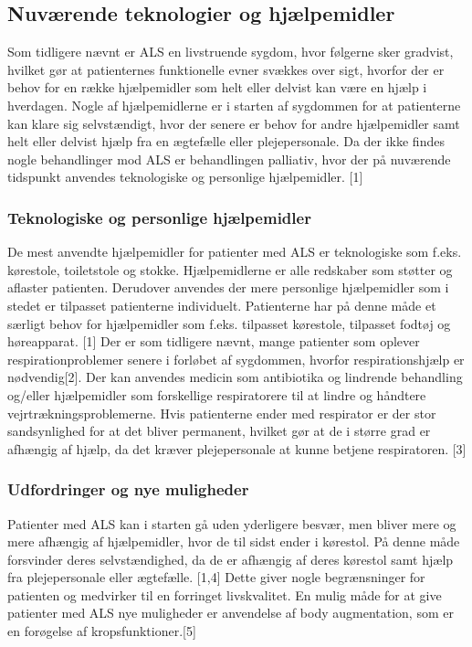 \subsection{Nuværende teknologier og hjælpemidler}
Som tidligere nævnt er ALS en livstruende sygdom, hvor følgerne sker gradvist, hvilket gør at patienternes funktionelle evner svækkes over sigt, hvorfor der er behov for en række hjælpemidler som helt eller delvist kan være en hjælp i hverdagen. Nogle af hjælpemidlerne er i starten af sygdommen for at patienterne kan klare sig selvstændigt, hvor der senere er behov for andre hjælpemidler samt helt eller delvist hjælp fra en ægtefælle eller plejepersonale. Da der ikke findes nogle behandlinger mod ALS er behandlingen palliativ, hvor der på nuværende tidspunkt anvendes teknologiske og personlige hjælpemidler. [1]

\subsubsection{Teknologiske og personlige hjælpemidler}
De mest anvendte hjælpemidler for patienter med ALS er teknologiske som f.eks.  kørestole, toiletstole og stokke. Hjælpemidlerne er alle redskaber som støtter og aflaster patienten. Derudover anvendes der mere personlige hjælpemidler som i stedet er tilpasset patienterne individuelt. Patienterne har på denne måde et særligt behov for hjælpemidler som f.eks. tilpasset kørestole, tilpasset fodtøj og høreapparat. [1]
Der er som tidligere nævnt, mange patienter som oplever respirationproblemer senere i forløbet af sygdommen, hvorfor respirationshjælp er nødvendig[2]. Der kan anvendes medicin som antibiotika  og lindrende behandling og/eller hjælpemidler som forskellige respiratorere til at lindre og håndtere vejrtrækningsproblemerne. Hvis patienterne ender med respirator er der stor sandsynlighed for at det bliver permanent, hvilket gør at de i større grad er afhængig af hjælp, da det kræver plejepersonale at kunne betjene respiratoren. [3]

\subsubsection{Udfordringer og nye muligheder}
Patienter med ALS kan i starten gå uden yderligere besvær, men bliver mere og mere afhængig af hjælpemidler, hvor de til sidst ender i kørestol. På denne måde forsvinder deres selvstændighed, da de er afhængig af deres kørestol samt hjælp fra plejepersonale eller ægtefælle. [1,4] Dette giver nogle begrænsninger for patienten og medvirker til en forringet livskvalitet. En mulig måde for at give patienter med ALS nye muligheder er anvendelse af body augmentation, som er en forøgelse af kropsfunktioner.[5] 

